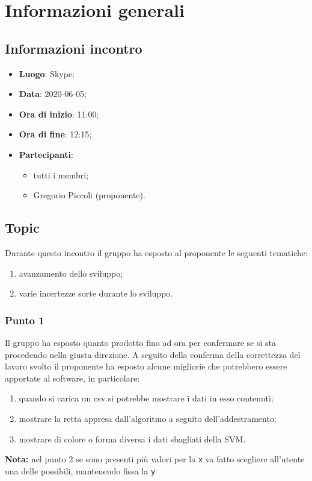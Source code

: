 \section{Informazioni generali}
\subsection{Informazioni incontro}
\begin{itemize}
	\item \textbf{Luogo}: Skype;
	\item \textbf{Data}: 2020-06-05;
	\item \textbf{Ora di inizio}: 11:00;
	\item \textbf{Ora di fine}: 12:15;
	\item \textbf{Partecipanti}:
	\begin{itemize}
		\item tutti i membri;
		\item Gregorio Piccoli (proponente).
	\end{itemize}
\end{itemize}

\subsection{Topic}
Durante questo incontro il gruppo ha esposto al proponente le seguenti tematiche:
\begin{enumerate}
	\item avanzamento dello sviluppo;
	\item varie incertezze sorte durante lo sviluppo.
\end{enumerate}

\subsubsection{Punto 1}
Il gruppo ha esposto quanto prodotto fino ad ora per confermare se si sta procedendo nella giusta direzione. A seguito della conferma della correttezza del lavoro svolto il proponente ha esposto alcune migliorie che potrebbero essere apportate al software, in particolare:
\begin{enumerate}
\item quando si carica un csv si potrebbe mostrare i dati in esso contenuti;
\item mostrare la retta appresa dall'algoritmo a seguito dell'addestramento;
\item mostrare di colore o forma diversa i dati sbagliati della SVM.
\end{enumerate}
\textbf{Nota:} nel punto 2 se sono presenti più valori per la \texttt{x} va fatto scegliere all'utente una delle possibili, mantenendo fissa la \texttt{y}

